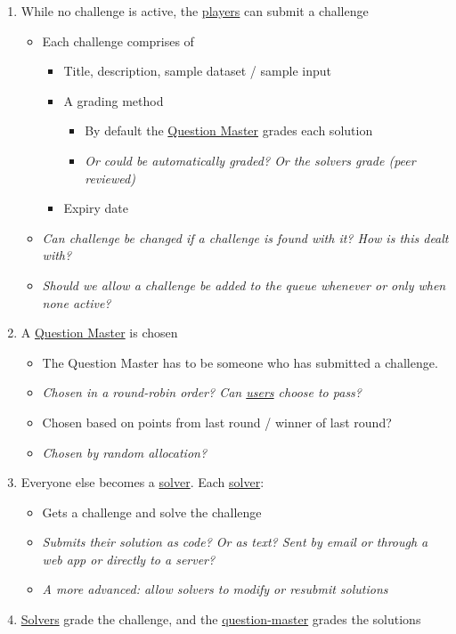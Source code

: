 \documentclass{report}
\begin{document}
\begin{enumerate}
\item While no challenge is active, the \underline{players} can submit a challenge
\begin{itemize}
\item Each challenge comprises of
\begin{itemize}
\item Title, description, sample dataset / sample input
\item A grading method
\begin{itemize}
\item By default the \underline{Question Master} grades each solution
\item \emph{Or could be automatically graded? Or the solvers grade (peer reviewed)}
\end{itemize}
\item Expiry date
\end{itemize}
\item \emph{Can challenge be changed if a challenge is found with it? How is this dealt with?}
\item \emph{Should we allow a challenge be added to the queue whenever or only when none active?}
\end{itemize}
\item A \underline{Question Master} is chosen
\begin{itemize}
\item The Question Master has to be someone who has submitted a challenge.
\item \emph{Chosen in a round-robin order? Can \underline{users} choose to pass?}
\item Chosen based on points from last round / winner of last round?
\item \emph{Chosen by random allocation?}
\end{itemize}
\item Everyone else becomes a \underline{solver}. Each \underline{solver}:
\begin{itemize}
\item Gets a challenge and solve the challenge
\item \emph{Submits their solution as code? Or as text? Sent by email or through a web app or directly to a server?}
\item \emph{A more advanced: allow solvers to modify or resubmit solutions}
\end{itemize}
\item \underline{Solvers} grade the challenge, and the \underline{question-master} grades the solutions

\end{enumerate}
\end{document}
